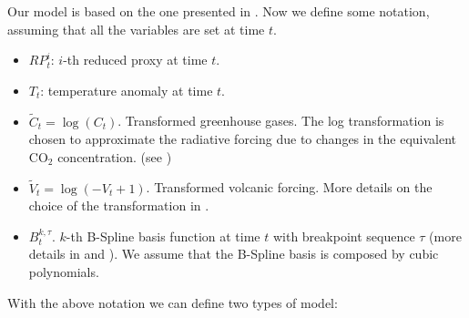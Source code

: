 \documentclass[11pt]{amsart}
\theoremstyle{plain}
\theoremstyle{definition}
\theoremstyle{remark}
\begin{document}
Our model is based on the one presented in \cite{Barboza2014}. Now we define
some notation, assuming that all the variables are set at time $t$.
\begin{itemize}
\item $RP_t^i$: $i$-th reduced proxy at time $t$.
  
\item $T_t$: temperature anomaly at time $t$.
  
\item $\tilde C_t = \log (C_t)$. Transformed greenhouse gases. The log
  transformation is chosen to approximate the radiative forcing due to changes
  in the equivalent CO$_2$ concentration. (see \cite{Barboza2014})
  
\item $\tilde V_t = \log (-V_t+1)$. Transformed volcanic forcing. More details
  on the choice of the transformation in \cite{Barboza2014}.
  
\item $B_t^{k,\tau}$. $k$-th B-Spline basis function at time $t$ with breakpoint
  sequence $\tau$ (more details in \cite{DeBoor2001} and \cite{Ramsay2005}). We assume that the
  B-Spline basis is composed by cubic polynomials.  
\end{itemize}
With the above notation we can define two types of model:
\end{document}
